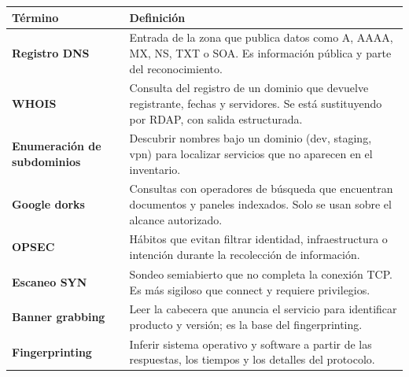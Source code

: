 \documentclass[11pt,a4paper]{article}
\begin{document}
\small
\begin{longtable}{@{}>{\raggedright\arraybackslash}p{4.2cm}>{\raggedright\arraybackslash}p{\dimexpr\linewidth-4.2cm-12pt\relax}@{}}
\toprule
\textbf{Término} & \textbf{Definición}\\
\midrule
\endhead
\bottomrule
\endlastfoot
\textbf{Registro DNS} & Entrada de la zona que publica datos como A, AAAA, MX, NS, TXT o SOA. Es información pública y parte del reconocimiento.\\
\textbf{WHOIS} & Consulta del registro de un dominio que devuelve registrante, fechas y servidores. Se está sustituyendo por RDAP, con salida estructurada.\\
\textbf{Enumeración de subdominios} & Descubrir nombres bajo un dominio (dev, staging, vpn) para localizar servicios que no aparecen en el inventario.\\
\textbf{Google dorks} & Consultas con operadores de búsqueda que encuentran documentos y paneles indexados. Solo se usan sobre el alcance autorizado.\\
\textbf{OPSEC} & Hábitos que evitan filtrar identidad, infraestructura o intención durante la recolección de información.\\
\textbf{Escaneo SYN} & Sondeo semiabierto que no completa la conexión TCP. Es más sigiloso que connect y requiere privilegios.\\
\textbf{Banner grabbing} & Leer la cabecera que anuncia el servicio para identificar producto y versión; es la base del fingerprinting.\\
\textbf{Fingerprinting} & Inferir sistema operativo y software a partir de las respuestas, los tiempos y los detalles del protocolo.\\
\end{longtable}
\end{document}
